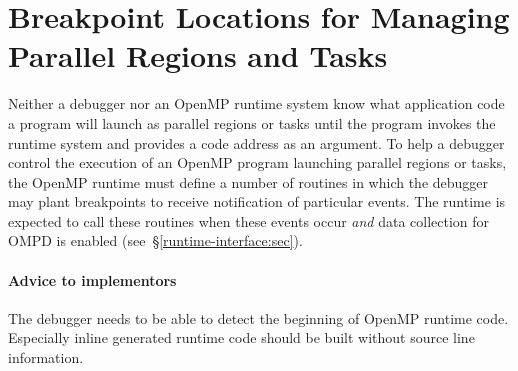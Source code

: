 \section{Breakpoint Locations for Managing Parallel Regions and Tasks}
\label{breakpoint-locations:sec}

Neither a debugger nor an OpenMP runtime system know what
application code a program will launch as parallel regions
or tasks until the program invokes the runtime system and
provides a code address as an argument.
To help a debugger control the execution of an OpenMP program
launching parallel regions or tasks,
the OpenMP runtime must define a number of routines in which
the debugger may plant breakpoints to receive notification of
particular events.
The runtime is expected to call these routines when these events occur
\emph{and} data collection for OMPD is
enabled (see~\S\ref{runtime-interface:sec}).

\paragraph{Advice to implementors} The debugger needs to be able to detect 
the beginning of OpenMP runtime code.
Especially inline generated runtime code should be built without source line
information.

